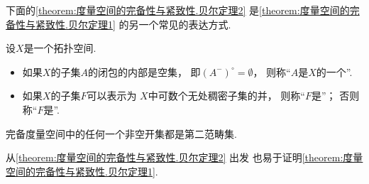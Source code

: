 下面的\cref{theorem:度量空间的完备性与紧致性.贝尔定理2}
是\cref{theorem:度量空间的完备性与紧致性.贝尔定理1} 的另一个常见的表达方式.
\begin{definition}
设\(X\)是一个拓扑空间.
\begin{itemize}
	\item 如果\(X\)的子集\(A\)的闭包的内部是空集，
	即\((A^-)^\circ = \emptyset\)，
	则称“\(A\)是\(X\)的一个”.

	\item 如果\(X\)的子集\(F\)可以表示为
	\(X\)中可数个无处稠密子集的并，
	则称“\(F\)是”；
	否则称“\(F\)是”.
\end{itemize}
\end{definition}

\begin{theorem}[贝尔定理]\label{theorem:度量空间的完备性与紧致性.贝尔定理2}
完备度量空间中的任何一个非空开集都是第二范畴集.
\end{theorem}

从\cref{theorem:度量空间的完备性与紧致性.贝尔定理2} 出发
也易于证明\cref{theorem:度量空间的完备性与紧致性.贝尔定理1}.
